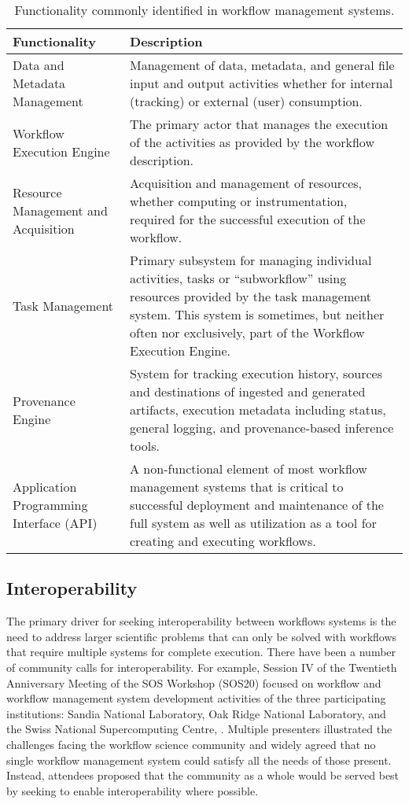 \begin{table*}[h] \begin{tabularx}{\textwidth}{|X|X|} \hline
\textbf{Functionality} & \textbf{Description} \tabularnewline\hline Data and
Metadata Management & Management of data, metadata, and general file input and
output activities whether for internal (tracking) or external (user)
consumption.  \tabularnewline\hline Workflow Execution Engine & The primary
actor that manages the execution of the activities as provided by the workflow
description. \tabularnewline\hline Resource Management and Acquisition &
Acquisition and management of resources, whether computing or instrumentation,
required for the successful execution of the workflow. \tabularnewline\hline
Task Management & Primary subsystem for managing individual activities, tasks or
``subworkflow'' using resources provided by the task management system. This
system is sometimes, but neither often nor exclusively, part of the Workflow
Execution Engine. \tabularnewline\hline Provenance Engine & System for tracking
execution history, sources and destinations of ingested and generated artifacts,
execution metadata including status, general logging, and provenance-based
inference tools. \tabularnewline\hline Application Programming Interface (API) &
A non-functional element of most workflow management systems that is critical to
successful deployment and maintenance of the full system as well as utilization
as a tool for creating and executing workflows. \tabularnewline\hline
\end{tabularx} \caption{Functionality commonly identified in workflow management
systems.} \label{blocks} \end{table*}

\subsection{Interoperability}

The primary driver for seeking interoperability between workflows systems is the
need to address larger scientific problems that can only be solved with
workflows that require multiple systems for complete execution. There have been
a number of community calls for interoperability. For example, Session IV of the
Twentieth Anniversary Meeting of the SOS Workshop (SOS20) focused on workflow
and workflow management system development activities of the three participating
institutions: Sandia National Laboratory, Oak Ridge National Laboratory, and the
Swiss National Supercomputing Centre, \cite{pack_sos20_2016}. Multiple
presenters illustrated the challenges facing the workflow science community and
widely agreed that no single workflow management system could satisfy all the
needs of those present. Instead, attendees proposed that the community as a
whole would be served best by seeking to enable interoperability where possible. 

